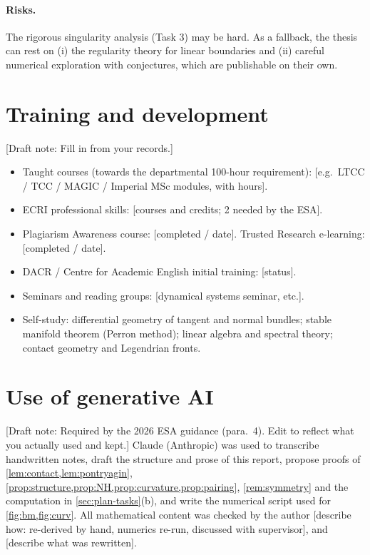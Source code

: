 \documentclass[11pt,a4paper]{article}
\newif\ifdraftnotes \draftnotestrue
\newcommand{\note}[1]{\ifdraftnotes{\color{BrickRed}\textsf{\footnotesize[Draft note: #1]}}\fi}
\theoremstyle{definition}
\theoremstyle{remark}
\begin{document}
\paragraph{Risks.} The rigorous singularity analysis (Task 3) may be hard. As a fallback, the thesis can rest on
(i) the regularity theory for linear boundaries and (ii) careful numerical exploration with conjectures, which are
publishable on their own.

\section{Training and development}
\note{Fill in from your records.}
\begin{itemize}
  \item Taught courses (towards the departmental 100-hour requirement): [e.g.\ LTCC / TCC / MAGIC / Imperial MSc modules,
  with hours].
  \item ECRI professional skills: [courses and credits; 2 needed by the ESA].
  \item Plagiarism Awareness course: [completed / date]. Trusted Research e-learning: [completed / date].
  \item DACR / Centre for Academic English initial training: [status].
  \item Seminars and reading groups: [dynamical systems seminar, etc.].
  \item Self-study: differential geometry of tangent and normal bundles; stable manifold theorem (Perron method);
  linear algebra and spectral theory; contact geometry and Legendrian fronts.
\end{itemize}

\section*{Use of generative AI}
\note{Required by the 2026 ESA guidance (para.~4). Edit to reflect what you actually used and kept.}
Claude (Anthropic) was used to transcribe handwritten notes, draft the structure and prose of this report, propose proofs
of \cref{lem:contact,lem:pontryagin}, \cref{prop:structure,prop:NH,prop:curvature,prop:pairing}, \cref{rem:symmetry} and the
computation in \cref{sec:plan-tasks}(b), and write the numerical script used for \cref{fig:bm,fig:curv}. All mathematical content was checked by the author [describe how: re-derived by hand,
numerics re-run, discussed with supervisor], and [describe what was rewritten].
\end{document}
